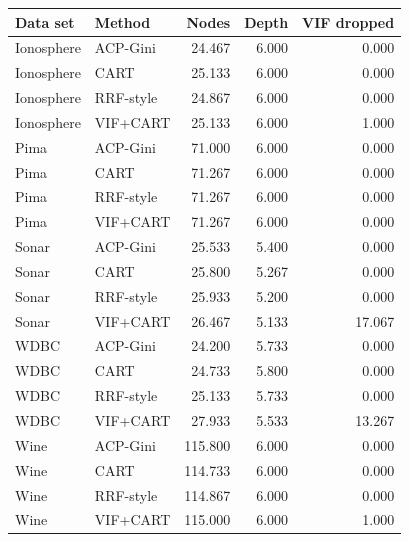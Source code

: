 \begin{tabular}{llrrr}
\toprule
Data set & Method & Nodes & Depth & VIF dropped \\
\midrule
Ionosphere & ACP-Gini & 24.467 & 6.000 & 0.000 \\
Ionosphere & CART & 25.133 & 6.000 & 0.000 \\
Ionosphere & RRF-style & 24.867 & 6.000 & 0.000 \\
Ionosphere & VIF+CART & 25.133 & 6.000 & 1.000 \\
Pima & ACP-Gini & 71.000 & 6.000 & 0.000 \\
Pima & CART & 71.267 & 6.000 & 0.000 \\
Pima & RRF-style & 71.267 & 6.000 & 0.000 \\
Pima & VIF+CART & 71.267 & 6.000 & 0.000 \\
Sonar & ACP-Gini & 25.533 & 5.400 & 0.000 \\
Sonar & CART & 25.800 & 5.267 & 0.000 \\
Sonar & RRF-style & 25.933 & 5.200 & 0.000 \\
Sonar & VIF+CART & 26.467 & 5.133 & 17.067 \\
WDBC & ACP-Gini & 24.200 & 5.733 & 0.000 \\
WDBC & CART & 24.733 & 5.800 & 0.000 \\
WDBC & RRF-style & 25.133 & 5.733 & 0.000 \\
WDBC & VIF+CART & 27.933 & 5.533 & 13.267 \\
Wine & ACP-Gini & 115.800 & 6.000 & 0.000 \\
Wine & CART & 114.733 & 6.000 & 0.000 \\
Wine & RRF-style & 114.867 & 6.000 & 0.000 \\
Wine & VIF+CART & 115.000 & 6.000 & 1.000 \\
\bottomrule
\end{tabular}
